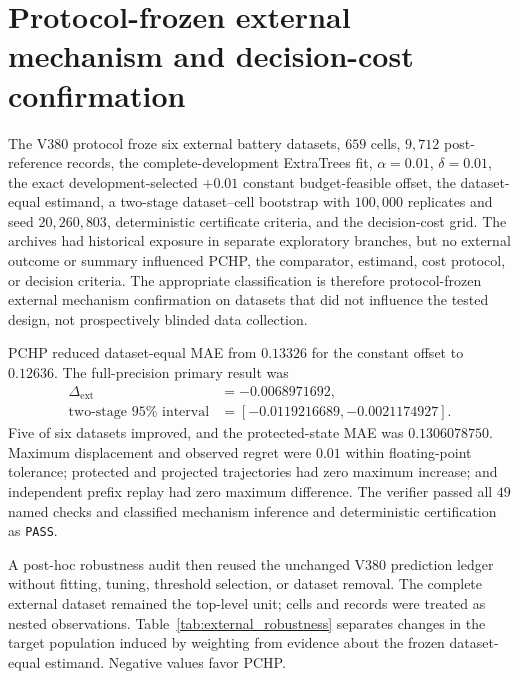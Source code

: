 \documentclass[11pt]{article}
\begin{document}
\section{Protocol-frozen external mechanism and decision-cost confirmation}

The V380 protocol froze six external battery datasets, $659$ cells, $9{,}712$ post-reference records, the complete-development ExtraTrees fit, $\alpha=0.01$, $\delta=0.01$, the exact development-selected $+0.01$ constant budget-feasible offset, the dataset-equal estimand, a two-stage dataset--cell bootstrap with $100{,}000$ replicates and seed $20{,}260{,}803$, deterministic certificate criteria, and the decision-cost grid. The archives had historical exposure in separate exploratory branches, but no external outcome or summary influenced PCHP, the comparator, estimand, cost protocol, or decision criteria. The appropriate classification is therefore protocol-frozen external mechanism confirmation on datasets that did not influence the tested design, not prospectively blinded data collection.

PCHP reduced dataset-equal MAE from $0.13326$ for the constant offset to $0.12636$. The full-precision primary result was
\[
\begin{aligned}
\Delta_{\mathrm{ext}}&=-0.0068971692,\\
\text{two-stage }95\%\text{ interval}&=[-0.0119216689,-0.0021174927].
\end{aligned}
\]
Five of six datasets improved, and the protected-state MAE was $0.1306078750$. Maximum displacement and observed regret were $0.01$ within floating-point tolerance; protected and projected trajectories had zero maximum increase; and independent prefix replay had zero maximum difference. The verifier passed all $49$ named checks and classified mechanism inference and deterministic certification as \texttt{PASS}.

A post-hoc robustness audit then reused the unchanged V380 prediction ledger without fitting, tuning, threshold selection, or dataset removal.  The complete external dataset remained the top-level unit; cells and records were treated as nested observations.  Table~\ref{tab:external_robustness} separates changes in the target population induced by weighting from evidence about the frozen dataset-equal estimand.  Negative values favor PCHP.
\end{document}
